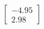 \documentclass[preview]{standalone}
\begin{document}
\begin{align*}
\begin{bmatrix} -4.95 \\ 2.98 \end{bmatrix}
\end{align*}
\end{document}
